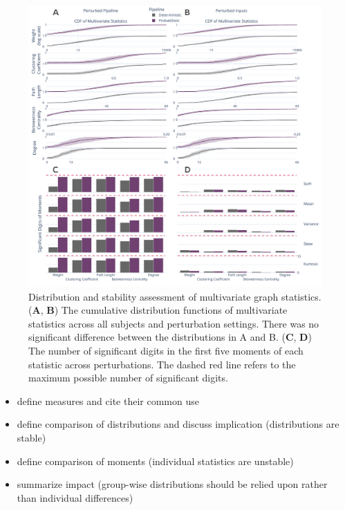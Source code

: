 \documentclass[fleqn,10pt]{SelfArx} %
\begin{document}
\begin{figure}[bt!]\centering
\includegraphics[width=\linewidth]{figures/fig2_multivariate_differences.pdf}
\caption{Distribution and stability assessment of multivariate graph statistics. (\textbf{A}, \textbf{B}) The
cumulative distribution functions of multivariate statistics across all subjects and perturbation settings. There was
no significant difference between the distributions in A and B. (\textbf{C}, \textbf{D}) The number of significant
digits in the first five moments of each statistic across perturbations. The dashed red line refers to the maximum
possible number of significant digits.}
\label{fig:multivar}
\end{figure}

\begin{itemize}
\item define measures and cite their common use
\item define comparison of distributions and discuss implication (distributions are stable)
\item define comparison of moments (individual statistics are unstable)
\item summarize impact (group-wise distributions should be relied upon rather than individual differences)
\end{itemize}
\end{document}

